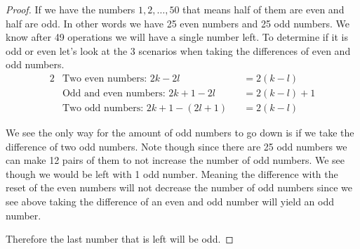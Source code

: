 \documentclass[11pt]{article}
\begin{document}
\begin{proof}
    If we have the numbers $1,2,\dots, 50$ that means half of them are even and half are odd. In other words we have 25 even numbers and 25 odd numbers. We know after 49 operations we will have a single number left. To determine if it is odd or even let's look at the 3 scenarios when taking the differences of even and odd numbers.
    \begin{alignat*}{2}
        &\text{Two even numbers: } 2k - 2l &&= 2(k-l) \\
        &\text{Odd and even numbers: } 2k + 1 - 2l &&= 2(k-l) + 1 \\
        &\text{Two odd numbers: } 2k + 1 - (2l + 1) &&= 2(k-l)
    \end{alignat*}

    We see the only way for the amount of odd numbers to go down is if we take the difference of two odd numbers. Note though since there are 25 odd numbers we can make 12 pairs of them to not increase the number of odd numbers. We see though we would be left with 1 odd number. Meaning the difference with the reset of the even numbers will not decrease the number of odd numbers since we see above taking the difference of an even and odd number will yield an odd number. 

    Therefore the last number that is left will be odd.
\end{proof}
\end{document}
